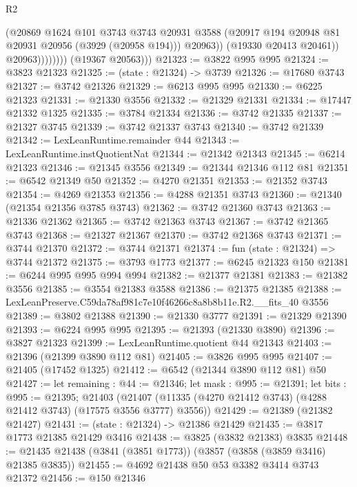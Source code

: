 \begin{lexlean}{R2}
\begin{coremodule}
                            (@20869
                              @1624
                              @101
                              @3743
                              @3743
                              @20931
                              @3588
                              (@20917 @194 @20948 @81 @20931 @20956 (@3929 (@20958 @194)))
                              @20963))
                          (@19330 @20413 @20461))
                        @20963))))))))
        (@19367 @20563)))
@21323 := @3822 @995 @995
@21324 := @3823 @21323
@21325 := (state : @21324) -> @3739
@21326 := @17680 @3743
@21327 := @3742 @21326
@21329 := @6213 @995 @995
@21330 := @6225 @21323
@21331 := @21330 @3556
@21332 := @21329 @21331
@21334 := @17447 @21332 @1325
@21335 := @3784 @21334
@21336 := @3742 @21335
@21337 := @21327 @3745
@21339 := @3742 @21337 @3743
@21340 := @3742 @21339
@21342 := LexLeanRuntime.remainder @44
@21343 := LexLeanRuntime.instQuotientNat
@21344 := @21342 @21343
@21345 := @6214 @21323
@21346 := @21345 @3556
@21349 := @21344 @21346 @112 @81
@21351 := @6542 @21349 @50
@21352 := @4270 @21351
@21353 := @21352 @3743
@21354 := @4269 @21353
@21356 := @4288 @21351 @3743
@21360 := @21340 (@21354 @21356 @3785 @3743)
@21362 := @3742 @21360 @3743
@21363 := @21336 @21362
@21365 := @3742 @21363 @3743
@21367 := @3742 @21365 @3743
@21368 := @21327 @21367
@21370 := @3742 @21368 @3743
@21371 := @3744 @21370
@21372 := @3744 @21371
@21374 := fun (state : @21324) => @3744 @21372
@21375 := @3793 @1773
@21377 := @6245 @21323 @150
@21381 := @6244 @995 @995 @994 @994
@21382 := @21377 @21381
@21383 := @21382 @3556
@21385 := @3554 @21383 @3588
@21386 := @21375 @21385
@21388 := LexLeanPreserve.C59da78af981c7e10f46266c8a8b8b11e.R2.__fits_40 @3556
@21389 := @3802 @21388
@21390 := @21330 @3777
@21391 := @21329 @21390
@21393 := @6224 @995 @995
@21395 := @21393 (@21330 @3890)
@21396 := @3827 @21323
@21399 := LexLeanRuntime.quotient @44 @21343
@21403 := @21396 (@21399 @3890 @112 @81)
@21405 := @3826 @995 @995
@21407 := @21405 (@17452 @1325)
@21412 := @6542 (@21344 @3890 @112 @81) @50
@21427 := let remaining : @44 := @21346;
  let mask : @995 := @21391;
  let bits : @995 := @21395;
  @21403 (@21407 (@11335 (@4270 @21412 @3743) (@4288 @21412 @3743) (@17575 @3556 @3777) @3556))
@21429 := @21389 (@21382 @21427)
@21431 := (state : @21324) -> @21386 @21429
@21435 := @3817 @1773 @21385 @21429 @3416
@21438 := @3825 (@3832 @21383) @3835
@21448 := @21435 @21438 (@3841 (@3851 @1773)) (@3857 (@3858 (@3859 @3416) @21385 @3835))
@21455 := @4692 @21438 @50 @53 @3382 @3414 @3743 @21372
@21456 := @150 @21346

\end{coremodule}
\end{lexlean}
